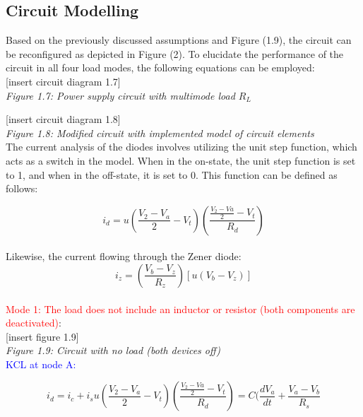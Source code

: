 \subsection{Circuit Modelling}
Based on the previously discussed assumptions and Figure (1.9), the circuit can be reconfigured as depicted in Figure (2). To elucidate the performance of the circuit in all four load modes, the following equations can be employed:\\

[insert circuit diagram 1.7]\\

\emph{Figure 1.7: Power supply circuit with multimode load $R_L$}

[insert circuit diagram 1.8]\\

\emph{Figure 1.8: Modified circuit with implemented model of circuit elements}\\

The current analysis of the diodes involves utilizing the unit step function, which acts as a switch in the model. When in the on-state, the unit step function is set to 1, and when in the off-state, it is set to 0. This function can be defined as follows:

\begin{equation}
    i_d=u(\frac{V_2-V_a}{2}-V_t)(\frac{\frac{V_2-Va}{2}-V_t}{R_d})
\end{equation}\\

Likewise, the current flowing through the Zener diode:\\

\begin{equation}
    i_z=(\frac{V_b-V_z}{R_z})[u(V_b-V_z)]
\end{equation}\\

\large\textcolor{red}{Mode 1: The load does not include an inductor or resistor (both components are deactivated)}:\\

[insert figure 1.9]\\

\emph{Figure 1.9: Circuit with no load (both devices off)}\\

\textcolor{blue}{KCL at node A:}

\begin{equation}
    i_d=i_c+i_s
    u(\frac{V_2-V_a}{2}-V_t)(\frac{\frac{V_2-Va}{2}-V_t}{R_d})=C(\frac{dV_a}{dt}+\frac{V_a-V_b}{R_s}
\end{equation}\\

